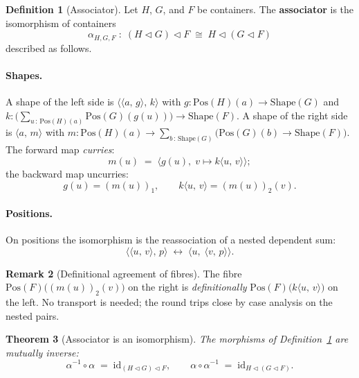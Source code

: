 \documentclass[11pt,a4paper]{article}
\theoremstyle{plain}
\newtheorem{theorem}{Theorem}[section]
\theoremstyle{definition}
\newtheorem{definition}[theorem]{Definition}
\newtheorem{remark}[theorem]{Remark}
\newcommand{\Shape}{\mathrm{Shape}}
\newcommand{\Pos}{\mathrm{Pos}}
\newcommand{\id}{\mathrm{id}}
\newcommand{\compop}{\mathbin{\triangleleft}}
\begin{document}
\begin{definition}[Associator]\label{def:associator}
Let $H$, $G$, and $F$ be containers. The \textbf{associator} is the
isomorphism of containers
\begin{equation}
  \alpha_{H,G,F} \;:\;
  (H\compop G)\compop F
  \;\cong\;
  H\compop(G\compop F)
\end{equation}
described as follows.

\paragraph{Shapes.}
A shape of the left side is
$\bigl\langle\langle a,\,g\rangle,\,k\bigr\rangle$ with
$g:\Pos(H)(a)\to\Shape(G)$ and
$k:\bigl(\sum_{u\,:\,\Pos(H)(a)}\Pos(G)(g(u))\bigr)\to\Shape(F)$.
A shape of the right side is $\langle a,\,m\rangle$ with
$m:\Pos(H)(a)\to\sum_{b\,:\,\Shape(G)}\bigl(\Pos(G)(b)\to\Shape(F)\bigr)$.
The forward map \emph{curries}:
\[
  m(u) \;=\; \bigl\langle g(u),\; v\mapsto k\langle u,\,v\rangle\bigr\rangle;
\]
the backward map uncurries:
\[
  g(u)=(m(u))_1,\qquad
  k\langle u,\,v\rangle=(m(u))_2(v).
\]

\paragraph{Positions.}
On positions the isomorphism is the reassociation of a nested dependent sum:
\begin{equation}
  \bigl\langle\langle u,\,v\rangle,\,p\bigr\rangle
  \;\longleftrightarrow\;
  \bigl\langle u,\;\langle v,\,p\rangle\bigr\rangle.
\end{equation}
\end{definition}

\begin{remark}[Definitional agreement of fibres]
The fibre $\Pos(F)\bigl((m(u))_2(v)\bigr)$ on the right is
\emph{definitionally} $\Pos(F)\bigl(k\langle u,\,v\rangle\bigr)$ on the left.
No transport is needed; the round trips close by case analysis on the nested
pairs.
\end{remark}

\begin{theorem}[Associator is an isomorphism]\label{thm:associator}
The morphisms of Definition~\ref{def:associator} are mutually inverse:
\begin{equation}
  \alpha^{-1}\circ\alpha \;=\; \id_{(H\compop G)\compop F},
  \qquad
  \alpha\circ\alpha^{-1} \;=\; \id_{H\compop(G\compop F)}.
\end{equation}
\end{theorem}
\end{document}

